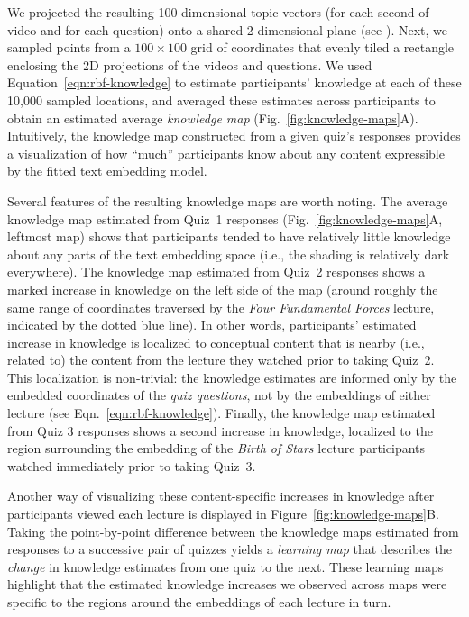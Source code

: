 \documentclass[10pt]{article}
\renewcommand{\nameref}[1]{\mbox{\textit{\oldnameref{#1}}}}
\begin{document}
We projected the resulting 100-dimensional topic vectors (for each second of
video and for each question) onto a shared 2-dimensional plane (see
\nameref{subsec:knowledge-maps}). Next, we sampled points from a $100 \times
100$ grid of coordinates that evenly tiled a rectangle enclosing the 2D
projections of the videos and questions. We used
Equation~\ref{eqn:rbf-knowledge} to estimate participants' knowledge at each of
these 10,000 sampled locations, and averaged these estimates across
participants to obtain an estimated average \textit{knowledge map}
(Fig.~\ref{fig:knowledge-maps}A). Intuitively, the knowledge map constructed
from a given quiz's responses provides a visualization of how ``much''
participants know about any content expressible by the fitted text embedding
model.

Several features of the resulting knowledge maps are worth noting. The average
knowledge map estimated from Quiz~1 responses (Fig.~\ref{fig:knowledge-maps}A,
leftmost map) shows that participants tended to have relatively little
knowledge about any parts of the text embedding space (i.e., the shading is
relatively dark everywhere). The knowledge map estimated from Quiz~2 responses
shows a marked increase in knowledge on the left side of the map (around
roughly the same range of coordinates traversed by the \textit{Four Fundamental
Forces} lecture, indicated by the dotted blue line). In other words,
participants' estimated increase in knowledge is localized to conceptual
content that is nearby (i.e., related to) the content from the lecture they
watched prior to taking Quiz~2. This localization is non-trivial: the knowledge
estimates are informed only by the embedded coordinates of the \textit{quiz
questions}, not by the embeddings of either lecture
(see Eqn.~\ref{eqn:rbf-knowledge}). Finally, the knowledge map estimated from Quiz
3 responses shows a second increase in knowledge, localized to the region
surrounding the embedding of the \textit{Birth of Stars} lecture participants
watched immediately prior to taking Quiz~3.

Another way of visualizing these content-specific increases in knowledge
after participants viewed each lecture is displayed in
Figure~\ref{fig:knowledge-maps}B. Taking the point-by-point difference between
the knowledge maps estimated from responses to a successive pair of quizzes
yields a \textit{learning map} that describes the \textit{change} in knowledge
estimates from one quiz to the next. These learning maps highlight that the
estimated knowledge increases we observed across maps were specific to the
regions around the embeddings of each lecture in turn.
\end{document}
